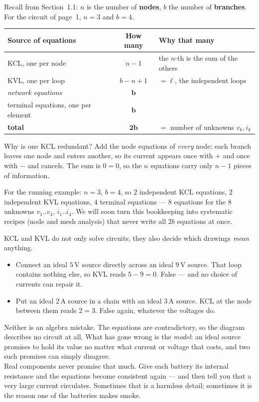 \documentclass[11pt,a4paper]{article}
\newcommand{\uni}[1]{\,\mathrm{#1}}
\newcommand{\A}{\uni{A}}   \newcommand{\V}{\uni{V}}
\begin{document}
Recall from Section~1.1: $n$ is the number of \textbf{nodes}, $b$ the number of
\textbf{branches}. For the circuit of page~1, $n = 3$ and $b = 4$.

\begin{center}
\small
\begin{tabular}{@{}l c l@{}}
\toprule
\textbf{Source of equations} & \textbf{How many} & \textbf{Why that many}\\
\midrule
KCL, one per node          & $n - 1$      & the $n$-th is the sum of the others\\
KVL, one per loop          & $b - n + 1$  & $=\ell$, the independent loops\\[2pt]
\quad \textit{network equations} & $\mathbf{b}$ & \\
\midrule
terminal equations, one per element & $\mathbf{b}$ & \\
\midrule
\textbf{total} & $\mathbf{2b}$ & $=$ number of unknowns $v_k, i_k$\\
\bottomrule
\end{tabular}
\end{center}

Why is one KCL redundant? Add the node equations of \emph{every} node: each branch leaves
one node and enters another, so its current appears once with $+$ and once with $-$ and
cancels. The sum is $0 = 0$, so the $n$ equations carry only $n-1$ pieces of information.

For the running example: $n = 3$, $b = 4$, so $2$ independent KCL equations, $2$
independent KVL equations, $4$ terminal equations --- $8$ equations for the $8$ unknowns
$v_1..v_4$, $i_1..i_4$. We will soon turn this bookkeeping into systematic recipes (node and mesh
analysis) that never write all $2b$ equations at once.

\begin{cautionbox}
KCL and KVL do not only solve circuits; they also decide which drawings \emph{mean}
anything.
\begin{itemize}
  \item Connect an ideal $5\V$ source directly across an ideal $9\V$ source. That loop
        contains nothing else, so KVL reads $5 - 9 = 0$. False --- and no choice of
        currents can repair it.
  \item Put an ideal $2\A$ source in a chain with an ideal $3\A$ source. KCL at the node
        between them reads $2 = 3$. False again, whatever the voltages do.
\end{itemize}
Neither is an algebra mistake. The equations are contradictory, so the diagram describes
no circuit at all. What has gone wrong is the \emph{model}: an ideal source promises to
hold its value no matter what current or voltage that costs, and two such promises can
simply disagree.\\[3pt]
Real components never promise that much. Give each battery its internal resistance and the
equations become consistent again --- and then tell you that a very large current
circulates. Sometimes that is a harmless detail; sometimes it is the reason one of the
batteries makes smoke.
\end{cautionbox}
\end{document}

